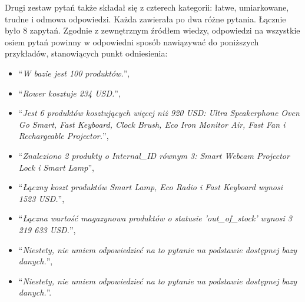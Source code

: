     Drugi zestaw pytań także składał się z czterech kategorii: łatwe, umiarkowane, trudne i odmowa odpowiedzi. Każda zawierała po dwa różne pytania. Łącznie było 8 zapytań. Zgodnie z zewnętrznym źródłem wiedzy, odpowiedzi na wszystkie osiem pytań powinny w odpowiedni sposób nawiązywać do poniższych przykładów, stanowiących punkt odniesienia:

    \begin{itemize}
        \item \enquote{\textit{W bazie jest 100 produktów.}},
        
        \item \enquote{\textit{Rower kosztuje 234 USD.}},
        
        \item \enquote{\textit{Jest 6 produktów kosztujących więcej niż 920 USD: Ultra Speakerphone Oven Go Smart, Fast Keyboard, Clock Brush, Eco Iron Monitor Air, Fast Fan i Rechargeable Projector.}},
        
        \item \enquote{\textit{Znaleziono 2 produkty o Internal\_ID równym 3: Smart Webcam Projector Lock i Smart Lamp}},

        \item \enquote{\textit{Łączny koszt produktów Smart Lamp, Eco Radio i Fast Keyboard wynosi 1523 USD.}},
        
        \item \enquote{\textit{Łączna wartość magazynowa produktów o statusie 'out\_of\_stock' wynosi 3 219 633 USD.}},
        
        \item \enquote{\textit{Niestety, nie umiem odpowiedzieć na to pytanie na podstawie dostępnej bazy danych.}},
        
        \item \enquote{\textit{Niestety, nie umiem odpowiedzieć na to pytanie na podstawie dostępnej bazy danych.}}.
    \end{itemize}
    
    
